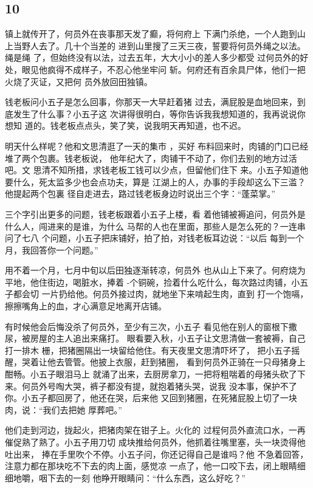{\centering\subsection{10}}

镇上就传开了，何员外在丧事那天发了癫，将何府上
下满门杀绝，一个人跑到山上当野人去了。几十个当差的
进到山里搜了三天三夜，誓要将何员外绳之以法。绳是绳
了，但始终没有以法，过去五年，大大小小的差人多少都受
过何员外的好处，眼见他疯得不成样子，不忍心他坐牢问
斩。何府还有百余具尸体，他们一把火烧了灭证，又把何
员外放回田独镇。

钱老板问小五子是怎么回事，你那天一大早赶着猪
过去，满屁股是血地回来，到底发生了什么事？小五子这
次讲得很明白，等你告诉我我想知道的，我再说说你想知
道的。钱老板点点头，笑了笑，说我明天再知道，也不迟。

明天什么样呢？他和文思清逛了一天的集市 ，买好
布料回来时，肉铺的门口已经堆了两个包裹。钱老板说，
他年纪大了，肉铺干不动了，你们去别的地方过活吧。文
思清不知所措，求钱老板工钱可以少点，但留他们住下
来。小五子知道他要什么，死太监多少也会点功夫，算是
江湖上的人，办事的手段却这么下三滥？他提起两个包裏
径自走进去，路过钱老板身边时说出三个字：“蓬菜掌。”

三个字引出更多的问题，钱老板跟着小五子上楼，看
着他铺被褥追问，何员外是什么人，闯进来的是谁，为什么
马帮的人也在里面，那些人是怎么死的？一连串问了七八
个问题，小五子把床铺好，拍了拍，对钱老板耳边说：“以后
每到一个月，我回答你一个问题。”

用不着一个月，七月中旬以后田独逐渐转凉，何员外
也从山上下来了。何府烧为平地，他住街边，喝脏水，捧着
-个铜碗，捡着什么吃什么，每次路过肉铺，小五子都会切
一片扔给他。何员外接过肉，就地坐下来啃起生肉，直到
打一个饱嗝，擦擦嘴角上的血，才心满意足地离开店铺。

有时候他会后悔没杀了何员外，至少有三次，小五子
看见他在别人的窗根下撒尿，被房屋的主人追出来痛打。
眼看要入秋，小五子让文思清做一套被褥，自己打一排木
栅，把猪圈隔出一块留给他住。有天夜里文思清吓坏了，
把小五子摇醒，哭着让他去管管。他披上衣服，赶到猪圈，
看到何员外正骑在一只母猪身上酣畅。小五子眼泪马上
就涌了出来，去厨房拿刀，一把将粗喘着的母猪头砍了下
来。何员外号啕大哭，裤子都没有提，就抱着猪头哭，说我
没本事，保护不了你。小五子都回房了，他还在哭，后来他
又回到猪圈，在死猪屁股上切了一块肉，说：“我们去把她
厚葬吧。”

他们走到河边，拢起火，把猪肉架在钳子上。火化的
过程何员外直流口水，一再催促熟了熟了。小五子用刀切
成块推给何员外，他抓着往嘴里塞，头一块烫得他吐出来，
捧在手里吹个不停。小五子问，你还记得自己是谁吗？他
不急着回答，注意力都在那块吃不下去的肉上面，感觉凉
一点了，他一口咬下去，闭上眼睛细细地嚼，咽下去的一刻
他睁开眼睛问：“什么东西，这么好吃？”

